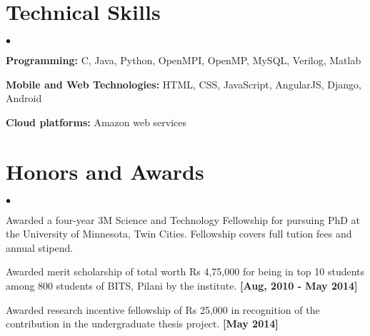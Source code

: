 \documentclass[margin,line]{res}
\newenvironment{list2}{
  \begin{list}{$\bullet$}{%
      \setlength{\itemsep}{0in}
      \setlength{\parsep}{0in} \setlength{\parskip}{0in}
      \setlength{\topsep}{0in} \setlength{\partopsep}{0in} 
      \setlength{\leftmargin}{0.2in}}}{\end{list}}
\begin{document}
\begin{resume}
\section{\sc Technical Skills} 
\begin{list2}

\item {\bf Programming:} C, Java, Python, OpenMPI, OpenMP, MySQL, Verilog, Matlab
\item {\bf Mobile and Web Technologies:} HTML, CSS, JavaScript, AngularJS, Django, Android
\item {\bf Cloud platforms:} Amazon web services
\end{list2}
 

\section{\sc Honors and Awards}
\begin{list2}
\item Awarded a four-year 3M Science and Technology Fellowship for pursuing PhD at the University of Minnesota, Twin Cities. Fellowship covers full tution fees and annual stipend.
\item Awarded merit scholarship of total worth Rs 4,75,000 for being in top 10 students among 800 students of BITS, Pilani by the institute. {\bf [Aug, 2010 - May 2014]}

\item Awarded research incentive fellowship of Rs 25,000 in recognition of the contribution in the
undergraduate thesis project. {\bf [May 2014]}

\end{list2}

\end{resume}
\end{document}
